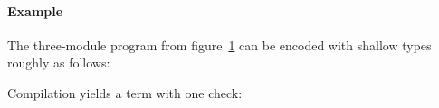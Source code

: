 \documentclass[screen=true, natbib=false, 10pt, sigplan]{acmart}
\newcommand{\FigureRef}[2]{#1}
\begin{document}
\paragraph{Example}

The three{-}module program from figure~\hyperref[t:x28counter_x28x22figurex22_x22figx3adsx2dexamplex22x29x29]{\FigureRef{1}{t:x28counter_x28x22figurex22_x22figx3adsx2dexamplex22x29x29}} can be encoded with
shallow types roughly as follows:


\noindent{}Compilation yields a term with one \relax{$\sscan$} check:

\end{document}
